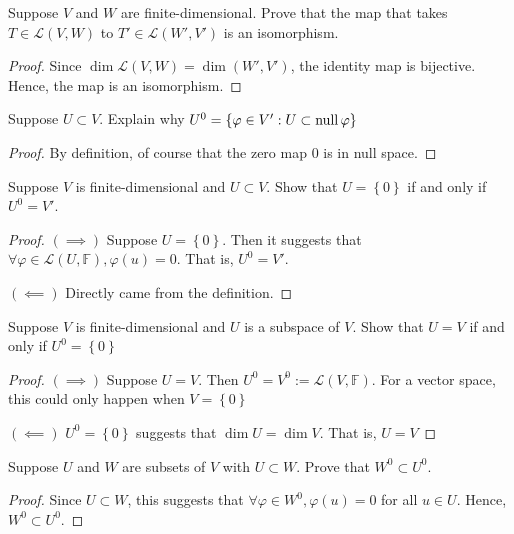 \begin{exercise}
Suppose $V$ and $W$ are finite-dimensional. Prove that the map that takes $T \in \mathcal{L}(V,W)$ to $T' \in \mathcal{L}(W',V')$ is an isomorphism.
\end{exercise}
\begin{proof}
	Since $\operatorname{dim} \mathcal{L}(V,W) = \operatorname{dim}(W',V')$, the identity map is bijective. Hence, the map is an isomorphism.
\end{proof}

\begin{exercise}
Suppose $U \subset V$. Explain why $U^0 = \left\{\varphi \in V' : U \subset \mathop{\mathrm{null}} \varphi \right\}$
\end{exercise}
\begin{proof}
	By definition, of course that the zero map $0$ is in null space.
\end{proof}

\newpage
\begin{exercise}
Suppose $V$ is finite-dimensional and $U \subset V$. Show that $U = \left\{0\right\} $ if and only if $U^0 = V'$.
\end{exercise}
\begin{proof}
	$(\implies)$ Suppose $U = \left\{0\right\}$. Then it suggests that $\forall \varphi \in \mathcal{L}(U, \mathbb{F}), \varphi(u) = 0$. That is, $U^0 = V'$. \par
	$(\impliedby)$ Directly came from the definition.
\end{proof}

\begin{exercise}
Suppose $V$ is finite-dimensional and $U$ is a subspace of $V$. Show that $U = V$ if and only if $U^0 = \left\{0\right\}$
\end{exercise}
\begin{proof}
	$(\implies)$ Suppose $U = V$. Then $U^0 = V^0 := \mathcal{L}(V, \mathbb{F})$. For a vector space, this could only happen when $V = \left\{0\right\} $ \par
	$(\impliedby)$ $U^0 = \left\{0\right\} $ suggests that $\operatorname{dim} U = \operatorname{dim} V$. That is, $U = V$
\end{proof}

\begin{exercise}
Suppose $U$ and $W$ are subsets of $V$ with $U \subset W$. Prove that $W^0 \subset U^0$.
\end{exercise}
\begin{proof}
	Since $U \subset W$, this suggests that $\forall \varphi \in W^0, \varphi(u) = 0$ for all $u \in U$. Hence, $W^0 \subset U^0$.
\end{proof}

